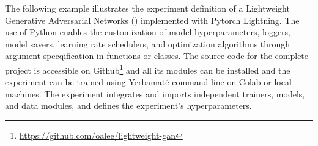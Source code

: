 The following example illustrates the experiment definition of a Lightweight Generative Adversarial Networks (\cite{lgan,goodfellow2020generative}) implemented with Pytorch Lightning. The use of Python enables the customization of model hyperparameters, loggers, model savers, learning rate schedulers, and optimization algorithms through argument specqification in functions or classes. The source code for the complete project is accessible on Github\footnote{\url{https://github.com/oalee/lightweight-gan}} and all its modules can be installed and the experiment can be trained using Yerbamaté command line on Colab or local machines. The experiment integrates and imports independent trainers, models, and data modules, and defines the experiment's hyperparameters.



